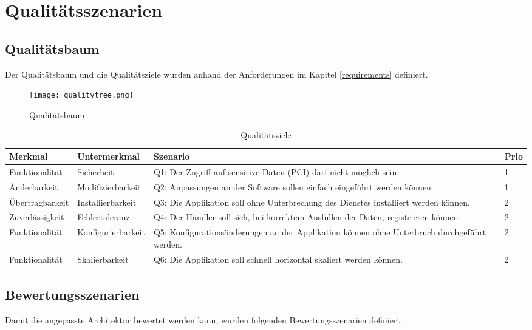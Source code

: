 \chapter{Qualitätsszenarien}
\label{sec:qualityscenarios}
\section{Qualitätsbaum}

Der Qualitätsbaum und die Qualitätsziele wurden anhand der Anforderungen im Kapitel \ref{requirements} definiert.

\begin{figure}[H]
	\centering
	\texttt{[image: qualitytree.png]}
	\caption{Qualitätsbaum}
\end{figure}

\begin{table}[H]
	\centering
	\caption{Qualitätsziele}
	\begin{tabular}{ | p{3cm} | p{3.5cm} | p{6.5cm} | p{1cm} | }
		\toprule
		{\textbf{Merkmal}} & {\textbf{Untermerkmal}} & {\textbf{Szenario}} & {\textbf{Prio}} \\
		\midrule
		Funktionalität & Sicherheit & Q1: Der Zugriff auf sensitive Daten (PCI) darf nicht möglich sein & 1 \\ \hline
		Änderbarkeit & Modifizierbarkeit & Q2: Anpassungen an der Software sollen einfach eingeführt werden können & 1 \\ \hline
		Übertragbarkeit & Installierbarkeit & Q3: Die Applikation soll ohne Unterbrechung des Dienstes installiert werden können. & 2 \\ \hline
		Zuverlässigkeit & Fehlertoleranz & Q4: Der Händler soll sich, bei korrektem Ausfüllen der Daten, registrieren können & 2 \\ \hline
		Funktionalität & Konfigurierbarkeit & Q5: Konfigurationsänderungen an der Applikation können ohne Unterbruch durchgeführt werden. & 2 \\ \hline
		Funktionalität & Skalierbarkeit & Q6: Die Applikation soll schnell horizontal skaliert werden können. & 2 \\
		\bottomrule
	\end{tabular}
\end{table}
\newpage
\section{Bewertungsszenarien}

Damit die angepasste Architektur bewertet werden kann, wurden folgenden Bewertungsszenarien definiert. 

